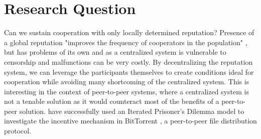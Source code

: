 \documentclass[english]{article}
\begin{document}
\section*{Research Question}
Can we sustain cooperation with only locally determined reputation?
Presence of a global reputation "improves the frequency of cooperators in the population" \citep{dong-reputation}, but has problems of its own and as a centralized system is vulnerable to censorship and malfunctions can be very costly.
By decentralizing the reputation system, we can leverage the participants themselves to create conditions ideal for cooperation while avoiding many shortcoming of the centralized system.
This is interesting in the context of peer-to-peer systems, where a centralized system is not a tenable solution as it would counteract most of the benefits of a peer-to-peer solution.
\citet{bittorrent-ipd} have successfully used an Iterated Prisoner’s Dilemma model to investigate the incentive mechanism in BitTorrent \citep{bittorrent}, a peer-to-peer file distribution protocol.
\end{document}
